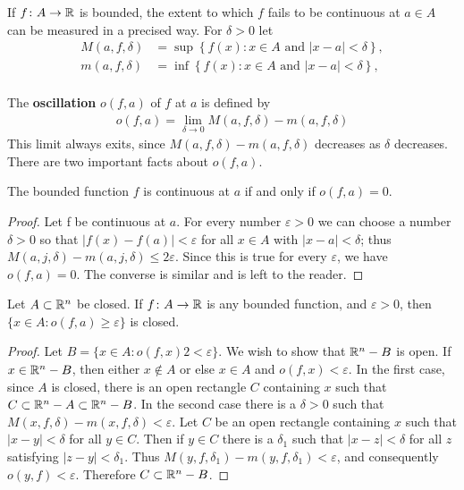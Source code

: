 If $f\colon{}A\to \mathbb{R}$ is bounded, the extent to which $f$ fails to be continuous at $a\in A$ can be measured in a precised 
way. For $\delta >0$ let 
\begin{align*}
    M(a, f, \delta) & = \sup\left\{f(x):x\in A\text{ and } |x-a|< \delta\right\}, \\
    m(a, f, \delta) & = \inf\left\{f(x):x\in A\text{ and } |x-a|< \delta\right\}, \\
\end{align*}

The \textbf{oscillation} $o(f, a)$ of $f$ at $a$ is defined by 
\begin{align*}
    o(f, a) = \lim_{\delta \to 0 }{M(a, f, \delta) - m(a, f, \delta)}
\end{align*}
This limit always exits, since $M(a, f, \delta) - m(a, f, \delta)$ decreases as $\delta$ decreases. There are two 
important facts about $o(f, a)$.

\begin{theorem}
    The bounded function $f$ is continuous at $a$ if and only if $o(f, a)= 0$.
\end{theorem}

\begin{proof}
    Let f be continuous at $a$. For every number $\varepsilon > 0$  
    we can choose a number $\delta > 0$ so that $|f(x) - f(a)|< \varepsilon$ for
    all $x \in A$ with $|x - a| < \delta$; thus $M(a,j,\delta)-m(a,j,\delta) \le 2\varepsilon$.
    Since this is true for every $\varepsilon$, we have $o(f,a) = 0$.
    The converse is similar and is left to the reader. 
\end{proof}



\begin{theorem}
    Let $A\subset \mathbb{R}^n$ be closed. If $f\colon{}A\to \mathbb{R}$ is any bounded function, and $\varepsilon>0$, then 
    $\{x\in A: o(f, a)\ge \varepsilon\}$ is closed.
\end{theorem}

\begin{proof}
    Let $B = \{x \in A: o(f,x) 2<\varepsilon\}$. We wish to show that $\mathbb{R}^n-B$ is open. 
    If $x \in \mathbb{R}^n -B$, then either $x \notin A$ or else $x \in A$ and $o(f,x) < \varepsilon$.
    In the first case, since $A$ is closed, there is an open rectangle $C$ containing $x$ such that
    $C \subset \mathbb{R}^n - A\subset \mathbb{R}^n-B$. In the second case there is a $\delta > 0$ 
    such that $M(x,f,\delta) - m(x,f,\delta) < \varepsilon$. Let $C$ be an open
    rectangle containing $x$ such that $|x - y|<\delta$ for all $y\in C$.
    Then if $y \in C$ there is a $\delta_1$ such that $|x - z| < \delta$ for all $z$
    satisfying $|z - y| < \delta_1$. Thus $M(y,f,\delta_1) - m(y,f,\delta_1) < \varepsilon$, and
    consequently $o(y,f) < \varepsilon$. Therefore $C \subset \mathbb{R}^n-B$.
\end{proof}


